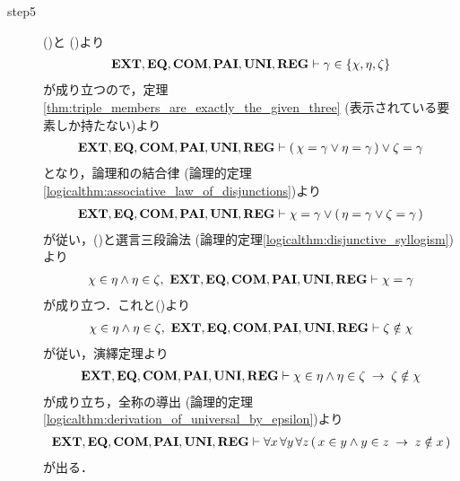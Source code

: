 \begin{sketch}
\begin{description}
			\item[step5] ()と
		()より
		\begin{align}
			\mbox{{\bf EXT}},\mbox{{\bf EQ}},\mbox{\bf COM},\mbox{{\bf PAI}},\mbox{{\bf UNI}},\mbox{{\bf REG}} \vdash \gamma \in \{\chi,\eta,\zeta\}
		\end{align}
		が成り立つので，定理\ref{thm:triple_members_are_exactly_the_given_three}
		(表示されている要素しか持たない)より
		\begin{align}
			\mbox{{\bf EXT}},\mbox{{\bf EQ}},\mbox{\bf COM},\mbox{{\bf PAI}},\mbox{{\bf UNI}},\mbox{{\bf REG}} \vdash 
			(\, \chi = \gamma \vee \eta = \gamma\, ) \vee \zeta = \gamma
		\end{align}
		となり，論理和の結合律
		(論理的定理\ref{logicalthm:associative_law_of_disjunctions})より
		\begin{align}
			\mbox{{\bf EXT}},\mbox{{\bf EQ}},\mbox{\bf COM},\mbox{{\bf PAI}},\mbox{{\bf UNI}},\mbox{{\bf REG}} \vdash 
			\chi = \gamma \vee (\, \eta = \gamma \vee \zeta = \gamma\, )
		\end{align}
		が従い，()と選言三段論法
		(論理的定理\ref{logicalthm:disjunctive_syllogism})より
		\begin{align}
			\chi \in \eta \wedge \eta \in \zeta,\ 
			\EXTAX,\EQAX,\COMAX,\PAIAX,\UNIAX,\REGAX \vdash \chi = \gamma
		\end{align}
		が成り立つ．これと()より
		\begin{align}
			\chi \in \eta \wedge \eta \in \zeta,\ 
			\EXTAX,\EQAX,\COMAX,\PAIAX,\UNIAX,\REGAX \vdash \zeta \notin \chi
		\end{align}
		が従い，演繹定理より
		\begin{align}
			\mbox{{\bf EXT}},\mbox{{\bf EQ}},\mbox{\bf COM},\mbox{{\bf PAI}},\mbox{{\bf UNI}},\mbox{{\bf REG}} \vdash 
			\chi \in \eta \wedge \eta \in \zeta \hspace{0.25em}\rightarrow\hspace{0.25em} \zeta \notin \chi
		\end{align}
		が成り立ち，全称の導出
		(論理的定理\ref{logicalthm:derivation_of_universal_by_epsilon})より
		\begin{align}
			\mbox{{\bf EXT}},\mbox{{\bf EQ}},\mbox{\bf COM},\mbox{{\bf PAI}},\mbox{{\bf UNI}},\mbox{{\bf REG}} \vdash 
			\forall x\, \forall y\, \forall z\, (\, x \in y \wedge y \in z 
			\hspace{0.25em}\rightarrow\hspace{0.25em} z \notin x\, )
		\end{align}
		が出る．
		\QED
		\end{description}
	\end{sketch}